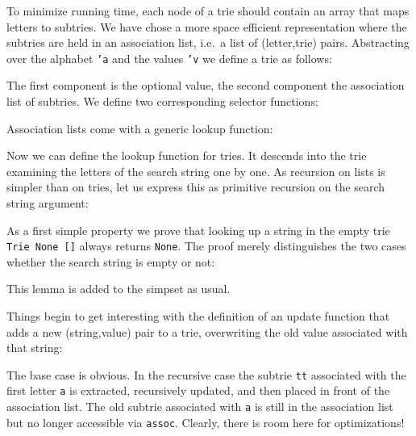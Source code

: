 To minimize running time, each node of a trie should contain an array that maps
letters to subtries. We have chose a more space efficient representation
where the subtries are held in an association list, i.e.\ a list of
(letter,trie) pairs.  Abstracting over the alphabet \texttt{'a} and the
values \texttt{'v} we define a trie as follows:
\begin{ttbox}
\end{ttbox}
The first component is the optional value, the second component the
association list of subtries. We define two corresponding selector functions:
\begin{ttbox}
\end{ttbox}
Association lists come with a generic lookup function:
\begin{ttbox}
\end{ttbox}

Now we can define the lookup function for tries. It descends into the trie
examining the letters of the search string one by one. As
recursion on lists is simpler than on tries, let us express this as primitive
recursion on the search string argument:
\begin{ttbox}
\end{ttbox}
As a first simple property we prove that looking up a string in the empty
trie \texttt{Trie~None~[]} always returns \texttt{None}. The proof merely
distinguishes the two cases whether the search string is empty or not:
\begin{ttbox}
\end{ttbox}
This lemma is added to the simpset as usual.

Things begin to get interesting with the definition of an update function
that adds a new (string,value) pair to a trie, overwriting the old value
associated with that string:
\begin{ttbox}
\end{ttbox}
The base case is obvious. In the recursive case the subtrie
\texttt{tt} associated with the first letter \texttt{a} is extracted,
recursively updated, and then placed in front of the association list.
The old subtrie associated with \texttt{a} is still in the association list
but no longer accessible via \texttt{assoc}. Clearly, there is room here for
optimizations!

